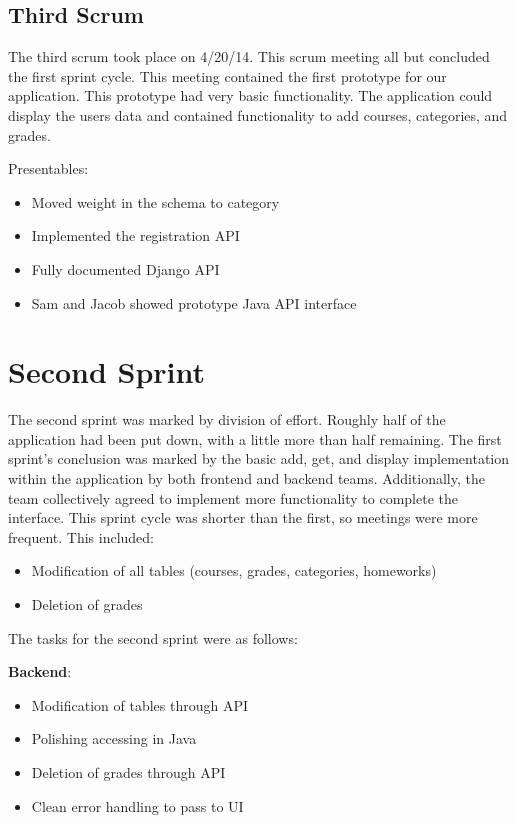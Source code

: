 \documentclass[a4paper]{article} %
\begin{document}
%
%

\subsection{Third Scrum} \label{First Sprint Third Scrum}

The third scrum took place on 4/20/14. This scrum meeting all but concluded the first sprint cycle. This meeting contained the first prototype for our application. This prototype had very basic functionality. The application could display the users data and contained functionality to add courses, categories, and grades.

Presentables:
\begin{itemize}
  \item Moved weight in the schema to category
    \item Implemented the registration API
    \item Fully documented Django API
    \item Sam and Jacob showed prototype Java API interface
\end{itemize}

\section{Second Sprint}

The second sprint was marked by division of effort. Roughly half of the application had been put down, with a little more than half remaining. The first sprint's conclusion was marked by the basic add, get, and display implementation within the application by both frontend and backend teams. Additionally, the team collectively agreed to implement more functionality to complete the interface. This sprint cycle was shorter than the first, so meetings were more frequent. This included:

\begin{itemize}
  \item Modification of all tables (courses, grades, categories, homeworks)
    \item Deletion of grades\\
\end{itemize}

The tasks for the second sprint were as follows: 

\textbf{Backend}:
\begin{itemize}
  \item Modification of tables through API
    \item Polishing accessing in Java
    \item Deletion of grades through API
    \item Clean error handling to pass to UI
\end{itemize}
\end{document}

